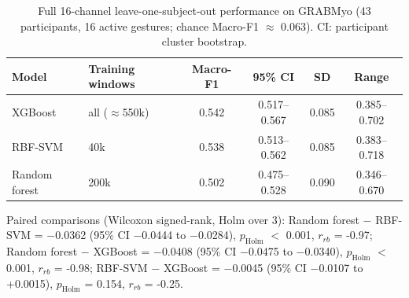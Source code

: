 \begin{table}[t]
\centering
\small
\caption{Full 16-channel leave-one-subject-out performance on GRABMyo (43 participants, 16 active gestures; chance Macro-F1 $\approx$ 0.063). CI: participant cluster bootstrap.}
\label{tab:full_channel}
\begin{tabular}{llcccc}
\toprule
Model & Training windows & Macro-F1 & 95\% CI & SD & Range \\
\midrule
XGBoost & all ($\approx$550k) & 0.542 & 0.517--0.567 & 0.085 & 0.385--0.702 \\
RBF-SVM & 40k & 0.538 & 0.513--0.562 & 0.085 & 0.383--0.718 \\
Random forest & 200k & 0.502 & 0.475--0.528 & 0.090 & 0.346--0.670 \\
\bottomrule
\end{tabular}
\par\smallskip\parbox{0.95\linewidth}{\footnotesize Paired comparisons (Wilcoxon signed-rank, Holm over 3): Random forest $-$ RBF-SVM = $-$0.0362 (95\% CI $-$0.0444 to $-$0.0284), $p_{\mathrm{Holm}}$ $<$ 0.001, $r_{rb}$ = -0.97; Random forest $-$ XGBoost = $-$0.0408 (95\% CI $-$0.0475 to $-$0.0340), $p_{\mathrm{Holm}}$ $<$ 0.001, $r_{rb}$ = -0.98; RBF-SVM $-$ XGBoost = $-$0.0045 (95\% CI $-$0.0107 to +0.0015), $p_{\mathrm{Holm}}$ = 0.154, $r_{rb}$ = -0.25.}
\end{table}
